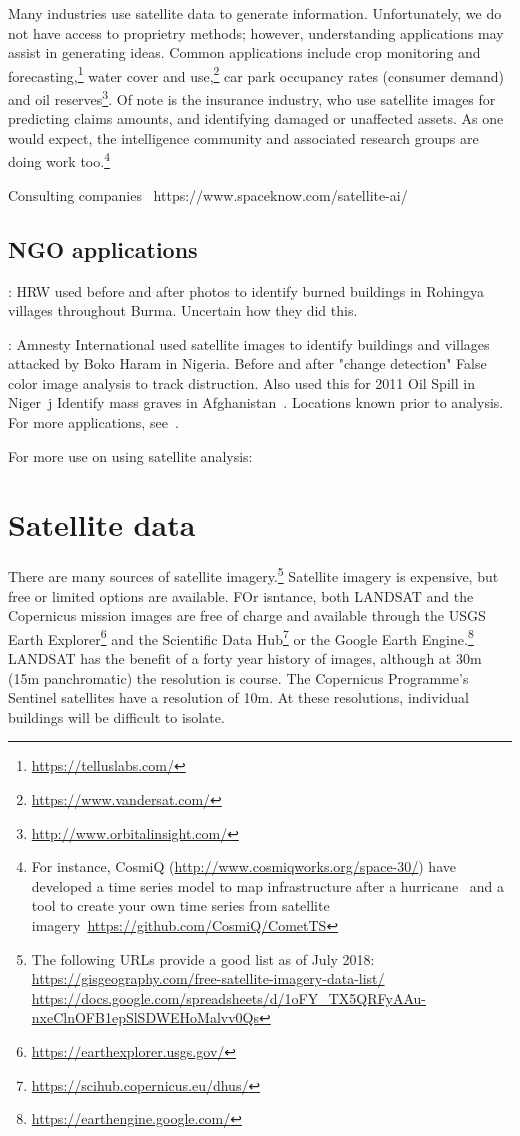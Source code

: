 \documentclass[12pt, a4paper, oneside, headinclude, footinclude]{article}
\begin{document}
Many industries use satellite data to generate information. Unfortunately, we
do not have access to proprietry methods; however, understanding applications
may assist in generating ideas. Common applications include crop monitoring
and forecasting,\footnote{\url{https://telluslabs.com/}} water cover and
use,\footnote{\url{https://www.vandersat.com/}} 
car park occupancy rates (consumer demand) and oil
reserves\footnote{\url{http://www.orbitalinsight.com/}}. Of note is the
insurance industry, who use satellite images for predicting claims amounts,
and identifying damaged or unaffected assets. As one would expect, the
intelligence community and associated research groups are doing work
too.\footnote{For instance, CosmiQ
(\url{http://www.cosmiqworks.org/space-30/}) have developed a time series
model to map infrastructure after a hurricane~\cite{cosmiq} and a tool to
create your own time series from satellite
imagery~\url{https://github.com/CosmiQ/CometTS}}

Consulting companies~\cite{CosmiQ,Satellite}
https://www.spaceknow.com/satellite-ai/

\subsection{NGO applications}

\cite{2016Burma}: HRW used before and after photos to identify burned buildings in
Rohingya villages throughout Burma. Uncertain how they did this.

\cite{2015Nigeria}: Amnesty International used satellite images to identify
buildings and villages attacked by Boko Haram in Nigeria.
Before and after "change detection"
False color image analysis to track distruction. Also used this for 2011 Oil Spill
in Niger~\cite{Koettl2011}j
Identify mass graves in Afghanistan~\cite{2013AAAS}. Locations known prior to
analysis.
For more applications, see~\cite{2014Human}.

For more use on using satellite analysis:
~\cite{Satellite,Making,2018High-Resolution}

\section{Satellite data}

There are many sources of satellite imagery.\footnote{The following URLs
provide a good list as of July 2018:
\url{https://gisgeography.com/free-satellite-imagery-data-list/}
\url{https://docs.google.com/spreadsheets/d/1oFY_TX5QRFyAAu-nxeClnOFB1epSlSDWEHoMalvv0Qs}}
Satellite imagery is expensive, but free or limited options are available. FOr
isntance, both LANDSAT and the Copernicus mission images are free of charge and
available through the USGS Earth
Explorer\footnote{\url{https://earthexplorer.usgs.gov/}} and the Scientific
Data Hub\footnote{\url{https://scihub.copernicus.eu/dhus/}} or the
Google Earth Engine.\footnote{\url{https://earthengine.google.com/}} LANDSAT
has the benefit of a forty year history of images, although at 30m (15m
panchromatic) the resolution is course. The Copernicus Programme's Sentinel
satellites have a resolution of 10m. At these resolutions, individual
buildings will be difficult to isolate.
\end{document}
